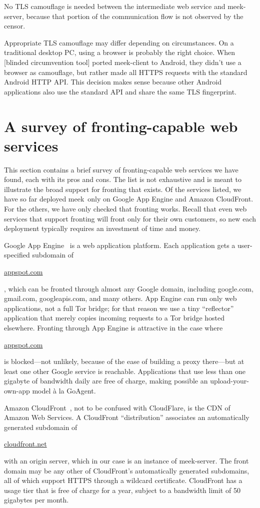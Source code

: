 \documentclass[conference]{IEEEtran}
\newcommand{\meekclient}{\mbox{meek-client}\xspace}
\newcommand{\meekserver}{\mbox{meek-server}\xspace}
\newcommand{\meek}{meek\xspace}
\def\urll#1{\begin{NoHyper}\url{#1}\end{NoHyper}}
\begin{document}
No TLS camouflage is needed between the intermediate web service and \meekserver,
because that portion of the communication flow is not observed by the censor.

Appropriate TLS camouflage may differ depending on circumstances.
On a traditional desktop PC, using a browser is probably the right choice.
When
[blinded circumvention tool]
ported \meekclient to Android,
they didn't use a browser as camouflage,
but rather made all HTTPS requests with the standard Android HTTP API.
This decision makes sense because other Android applications
also use the standard API and share the same TLS fingerprint.

\section{A survey of fronting-capable web services}
\label{sec:survey}

This section contains a brief survey of fronting-capable
web services we have found, each with its pros and cons.
The list is not exhaustive and is meant to illustrate the broad
support for fronting that exists.
Of the services listed, we have so far deployed \meek\
only on Google App Engine and Amazon CloudFront.
For the others, we have only checked that fronting works.
Recall that even web services that support fronting
will front only for their own customers,
so new each deployment typically requires an investment of time and money.

Google App Engine~\cite{googleappengine}
is a web application platform.
Each application gets a user-specified subdomain of \urll{appspot.com},
which can be fronted through almost any Google domain,
including google.com, gmail.com, googleapis.com, and many others.
App Engine can run only web applications,
not a full Tor bridge;
for that reason we use a tiny ``reflector'' application
that merely copies incoming requests to a Tor bridge hosted elsewhere.
Fronting through App Engine is attractive in the case where
\urll{appspot.com} is blocked---not unlikely,
because of the ease of building a proxy there---but
at least one other Google service is reachable.
Applications that use less than one gigabyte of bandwidth daily
are free of charge,
making possible an upload-your-own-app model
à la GoAgent.

Amazon CloudFront~\cite{cloudfront},
not to be confused with CloudFlare,
is the CDN of Amazon Web Services.
A CloudFront ``distribution'' associates
an automatically generated subdomain of \urll{cloudfront.net}
with an origin server,
which in our case is an instance of \meekserver.
The front domain may be any other of CloudFront's automatically generated subdomains, all
of which support HTTPS through a wildcard certificate.
CloudFront has a usage tier that is free of charge for a year,
subject to a bandwidth limit of 50 gigabytes per month.
\end{document}
